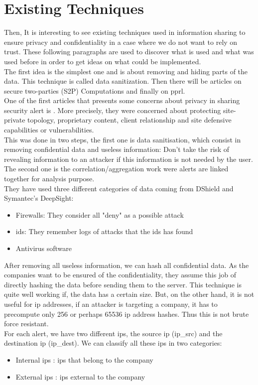 \documentclass{eplmastersthesis}
\begin{document}
\section{Existing Techniques}
Then, It is interesting to see existing techniques used in information sharing to ensure privacy and confidentiality in a case where we do not want to rely on trust. These following paragraphs are used to discover what is used and what was used before in order to get ideas on what could be implemented.\\

The first idea is the simplest one and is about removing and hiding parts of the data. This technique is called data sanitization. Then there will be articles on secure two-parties (S2P) Computations and finally on \gls{pprl}.\\

One of the first articles that presents some concerns about privacy in sharing security alert is \cite{lincoln2004privacy}.
More precisely, they were concerned about protecting site-private topology, proprietary content, client relationship and site defensive capabilities or vulnerabilities.\\
This was done in two steps, the first one is data sanitisation, which consist in removing confidential data and useless information: Don't take the risk of revealing information to an attacker if this information is not needed by the user.\\
The second one is the correlation/aggregation work were alerts are linked together for analysis purpose.\\
 They have used three different categories of data coming from DShield and Symantec's DeepSight:
\begin{itemize}
\item Firewalls: They consider all "deny" as a possible attack
\item \gls{ids}: They remember logs of attacks that the \gls{ids} has found
\item Antivirus software
\end{itemize}

After removing all useless information, we can hash all confidential data. As the companies want to be ensured of the confidentiality, they assume this job of directly hashing the data before sending them to the server.
This technique is quite well working if, the data has a certain size. But, on the other hand, it is not useful for \gls{ip} addresses, if an attacker is targeting a company, it has to precompute only 256 or perhaps 65536 \gls{ip} address hashes. Thus this is not brute force resistant.\\
For each alert, we have two different \gls{ip}s, the source \gls{ip} (ip\_src) and the destination \gls{ip} (ip\_dest). We can classify all these \gls{ip}s in two categories:
\begin{itemize}
	\item Internal \gls{ip}s : \gls{ip}s that belong to the company
	\item External \gls{ip}s : \gls{ip}s external to the company
\end{itemize}
\end{document}
